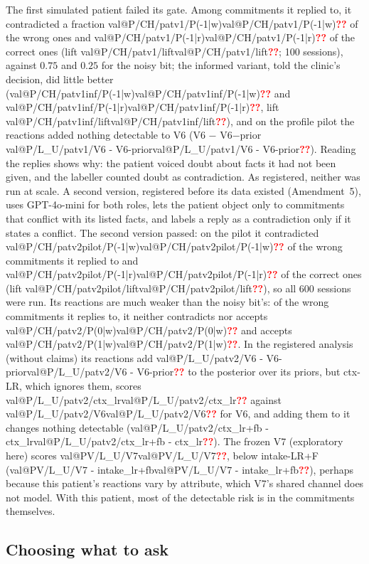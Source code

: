 \documentclass[10pt,a4paper,twocolumn]{article}
\makeatletter
\newcommand{\val}[1]{\ifcsname val@#1\endcsname\csname val@#1\endcsname\else\textcolor{red}{\textbf{??}}\fi}
\newif\iffinal \finaltrue
\newcommand{\chk}[1]{\iffinal#1\else\textcolor{blue}{#1}\fi}
\makeatother
\begin{document}
\chk{The first simulated patient failed its gate. Among commitments it
replied to, it contradicted a fraction \val{P/CH/patv1/P(-1|w)} of the wrong
ones and \val{P/CH/patv1/P(-1|r)} of the correct ones (lift
\val{P/CH/patv1/lift}; 100 sessions), against $0.75$ and $0.25$ for the noisy
bit; the informed variant, told the clinic's decision, did little better
(\val{P/CH/patv1inf/P(-1|w)} and \val{P/CH/patv1inf/P(-1|r)}, lift
\val{P/CH/patv1inf/lift}), and on the profile pilot the reactions added
nothing detectable to V6 (V6 $-$ V6$-$prior \val{P/L_U/patv1/V6 - V6-prior}). Reading
the replies shows why: the patient voiced doubt about facts
it had not been given, and the labeller counted doubt as contradiction. As
registered, neither was run at scale. A second version, registered before its data existed
(Amendment~5), uses GPT-4o-mini for both roles, lets the patient object only
to commitments that conflict with its listed facts, and labels a reply as a
contradiction only if it states a conflict.}
\chk{The second version passed: on the pilot it contradicted
\val{P/CH/patv2pilot/P(-1|w)} of the wrong commitments it replied to and
\val{P/CH/patv2pilot/P(-1|r)} of the correct ones (lift
\val{P/CH/patv2pilot/lift}), so all 600 sessions were run. Its reactions are
much weaker than the noisy bit's: of the wrong commitments it replies to,
it neither contradicts nor accepts \val{P/CH/patv2/P(0|w)} and accepts
\val{P/CH/patv2/P(1|w)}. In the
registered analysis (without claims) its reactions add
\val{P/L_U/patv2/V6 - V6-prior} to the posterior over its priors, but ctx-LR,
which ignores them, scores \val{P/L_U/patv2/ctx_lr} against
\val{P/L_U/patv2/V6} for V6, and adding them to it changes nothing detectable
(\val{P/L_U/patv2/ctx_lr+fb - ctx_lr}). The frozen V7 (exploratory here)
scores \val{PV/L_U/V7}, below intake-LR+F (\val{PV/L_U/V7 - intake_lr+fb}),
perhaps because this patient's reactions vary by attribute, which V7's
shared channel does not model. With this patient, most of the detectable
risk is in the commitments themselves.}

\subsection{Choosing what to ask}
\label{sec:exp-loop}
\end{document}
